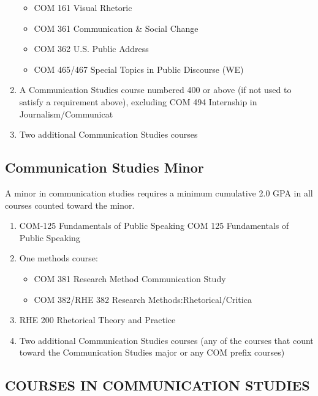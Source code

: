 \documentclass[
  letterpaper,
]{scrbook}
\providecommand{\tightlist}{%
  \setlength{\itemsep}{0pt}\setlength{\parskip}{0pt}}
\begin{document}
\begin{enumerate}
  \begin{itemize}
  \tightlist
  \item
    COM 161 Visual Rhetoric
  \item
    COM 361 Communication \& Social Change
  \item
    COM 362 U.S. Public Address
  \item
    COM 465/467 Special Topics in Public Discourse (WE)
  \end{itemize}
\item
  A Communication Studies course numbered 400 or above (if not used to
  satisfy a requirement above), excluding COM 494 Internship in
  Journalism/Communicat
\item
  Two additional Communication Studies courses
\end{enumerate}

\subsection{Communication Studies
Minor}\label{communication-studies-minor}

A minor in communication studies requires a minimum cumulative 2.0 GPA
in all courses counted toward the minor.

\begin{enumerate}
\def\labelenumi{\arabic{enumi}.}
\tightlist
\item
  COM-125 Fundamentals of Public Speaking COM 125 Fundamentals of Public
  Speaking
\item
  One methods course:

  \begin{itemize}
  \tightlist
  \item
    COM 381 Research Method Communication Study
  \item
    COM 382/RHE 382 Research Methods:Rhetorical/Critica
  \end{itemize}
\item
  RHE 200 Rhetorical Theory and Practice
\item
  Two additional Communication Studies courses (any of the courses that
  count toward the Communication Studies major or any COM prefix
  courses)
\end{enumerate}

\subsection{COURSES IN COMMUNICATION
STUDIES}\label{courses-in-communication-studies}
\end{document}

